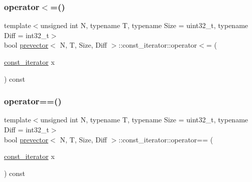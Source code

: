 \mbox{\label{classprevector_1_1const__iterator_a4ceaac998a4face78b7a2041023281f1}} 
\subsubsection{\texorpdfstring{operator$<$=()}{operator<=()}}
{\footnotesize\ttfamily template$<$unsigned int N, typename T, typename Size = uint32\+\_\+t, typename Diff = int32\+\_\+t$>$ \\
bool \mbox{\hyperlink{classprevector}{prevector}}$<$ N, T, Size, Diff $>$\+::const\+\_\+iterator\+::operator$<$= (\begin{DoxyParamCaption}\item[{\mbox{\hyperlink{classprevector_1_1const__iterator}{const\+\_\+iterator}}}]{x }\end{DoxyParamCaption}) const\hspace{0.3cm}{\ttfamily [inline]}}

\mbox{\label{classprevector_1_1const__iterator_a01bdd619167613fae83f13ab6c414b7c}} 
\subsubsection{\texorpdfstring{operator==()}{operator==()}}
{\footnotesize\ttfamily template$<$unsigned int N, typename T, typename Size = uint32\+\_\+t, typename Diff = int32\+\_\+t$>$ \\
bool \mbox{\hyperlink{classprevector}{prevector}}$<$ N, T, Size, Diff $>$\+::const\+\_\+iterator\+::operator== (\begin{DoxyParamCaption}\item[{\mbox{\hyperlink{classprevector_1_1const__iterator}{const\+\_\+iterator}}}]{x }\end{DoxyParamCaption}) const\hspace{0.3cm}{\ttfamily [inline]}}

\mbox{\label{classprevector_1_1const__iterator_aed6699768819221696f4e2b6db2b9a0f}} 
